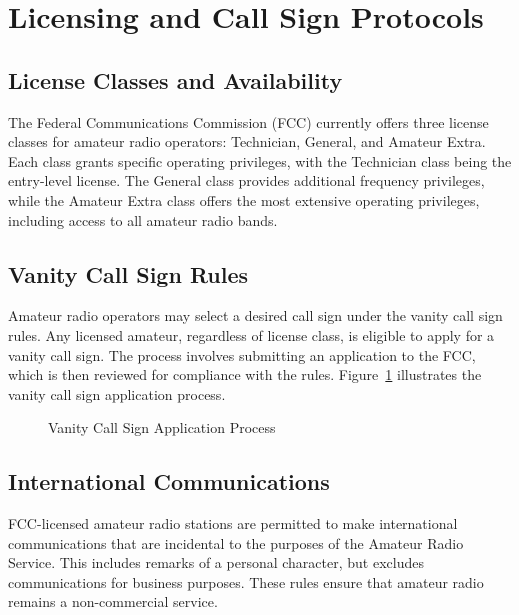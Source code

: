 \section{Licensing and Call Sign Protocols}
\label{sec:licensing_call_signs}

\subsection*{License Classes and Availability}
The Federal Communications Commission (FCC) currently offers three license classes for amateur radio operators: Technician, General, and Amateur Extra. Each class grants specific operating privileges, with the Technician class being the entry-level license. The General class provides additional frequency privileges, while the Amateur Extra class offers the most extensive operating privileges, including access to all amateur radio bands.

\subsection*{Vanity Call Sign Rules}
Amateur radio operators may select a desired call sign under the vanity call sign rules. Any licensed amateur, regardless of license class, is eligible to apply for a vanity call sign. The process involves submitting an application to the FCC, which is then reviewed for compliance with the rules. Figure~\ref{fig:vanity_call_sign_flow} illustrates the vanity call sign application process.

\begin{figure}[h!]
    \centering
    \caption{Vanity Call Sign Application Process}
    \label{fig:vanity_call_sign_flow}
\end{figure}

\subsection*{International Communications}
FCC-licensed amateur radio stations are permitted to make international communications that are incidental to the purposes of the Amateur Radio Service. This includes remarks of a personal character, but excludes communications for business purposes. These rules ensure that amateur radio remains a non-commercial service.

